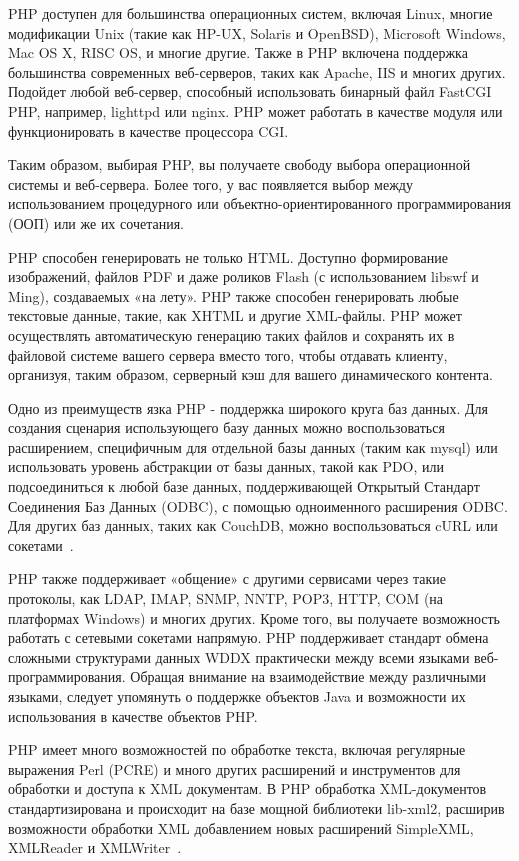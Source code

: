 PHP доступен для большинства операционных систем, включая Linux, многие модификации Unix (такие как HP-UX, Solaris и OpenBSD), Microsoft Windows, Mac OS X, RISC OS, и многие другие. Также в PHP включена поддержка большинства современных веб-серверов, таких как Apache, IIS и многих других. Подойдет любой веб-сервер, способный использовать бинарный файл FastCGI PHP, например, lighttpd или nginx. PHP может работать в качестве модуля или функционировать в качестве процессора CGI.

Таким образом, выбирая PHP, вы получаете свободу выбора операционной системы и веб-сервера. Более того, у вас появляется выбор между использованием процедурного или объектно-ориентированного программирования (ООП) или же их сочетания.

PHP способен генерировать не только HTML. Доступно формирование изображений, файлов PDF и даже роликов Flash (с использованием libswf и Ming), создаваемых «на лету». PHP также способен генерировать любые текстовые данные, такие, как XHTML и другие XML-файлы. PHP может осуществлять автоматическую генерацию таких файлов и сохранять их в файловой системе вашего сервера вместо того, чтобы отдавать клиенту, организуя, таким образом, серверный кэш для вашего динамического контента.

Одно из преимуществ язка PHP - поддержка широкого круга баз данных. Для создания сценария использующего базу данных можно воспользоваться расширением, специфичным для отдельной базы данных (таким как mysql) или использовать уровень абстракции от базы данных, такой как PDO, или подсоединиться к любой базе данных, поддерживающей Открытый Стандарт Соединения Баз Данных (ODBC), с помощью одноименного расширения ODBC. Для других баз данных, таких как CouchDB, можно воспользоваться cURL или сокетами~\cite{php_documents}.

PHP также поддерживает «общение» с другими сервисами через такие протоколы, как LDAP, IMAP, SNMP, NNTP, POP3, HTTP, COM (на платформах Windows) и многих других. Кроме того, вы получаете возможность работать с сетевыми сокетами напрямую. PHP поддерживает стандарт обмена сложными структурами данных WDDX практически между всеми языками веб-программирования. Обращая внимание на взаимодействие между различными языками, следует упомянуть о поддержке объектов Java и возможности их использования в качестве объектов PHP.

PHP имеет много возможностей по обработке текста, включая регулярные выражения Perl (PCRE) и много других расширений и инструментов для обработки и доступа к XML документам. В PHP обработка XML-документов стандартизирована и происходит на базе мощной библиотеки lib-xml2, расширив возможности обработки XML добавлением новых расширений SimpleXML, XMLReader и XMLWriter~\cite{php_documents}.

